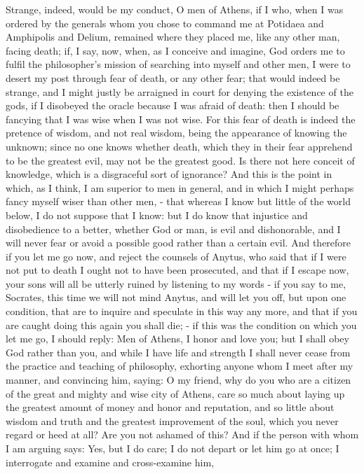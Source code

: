 Strange, indeed, would be my conduct, O men of Athens, if I who, when
I was ordered by the generals whom you chose to command me at Potidaea
and Amphipolis and Delium, remained where they placed me, like any
other man, facing death; if, I say, now, when, as I conceive and imagine,
God orders me to fulfil the philosopher's mission of searching into
myself and other men, I were to desert my post through fear of death,
or any other fear; that would indeed be strange, and I might justly
be arraigned in court for denying the existence of the gods, if I
disobeyed the oracle because I was afraid of death: then I should
be fancying that I was wise when I was not wise. For this fear of
death is indeed the pretence of wisdom, and not real wisdom, being
the appearance of knowing the unknown; since no one knows whether
death, which they in their fear apprehend to be the greatest evil,
may not be the greatest good. Is there not here conceit of knowledge,
which is a disgraceful sort of ignorance? And this is the point in
which, as I think, I am superior to men in general, and in which I
might perhaps fancy myself wiser than other men, - that whereas I
know but little of the world below, I do not suppose that I know:
but I do know that injustice and disobedience to a better, whether
God or man, is evil and dishonorable, and I will never fear or avoid
a possible good rather than a certain evil. And therefore if you let
me go now, and reject the counsels of Anytus, who said that if I were
not put to death I ought not to have been prosecuted, and that if
I escape now, your sons will all be utterly ruined by listening to
my words - if you say to me, Socrates, this time we will not mind
Anytus, and will let you off, but upon one condition, that are to
inquire and speculate in this way any more, and that if you are caught
doing this again you shall die; - if this was the condition on which
you let me go, I should reply: Men of Athens, I honor and love you;
but I shall obey God rather than you, and while I have life and strength
I shall never cease from the practice and teaching of philosophy,
exhorting anyone whom I meet after my manner, and convincing him,
saying: O my friend, why do you who are a citizen of the great and
mighty and wise city of Athens, care so much about laying up the greatest
amount of money and honor and reputation, and so little about wisdom
and truth and the greatest improvement of the soul, which you never
regard or heed at all? Are you not ashamed of this? And if the person
with whom I am arguing says: Yes, but I do care; I do not depart or
let him go at once; I interrogate and examine and cross-examine him,
